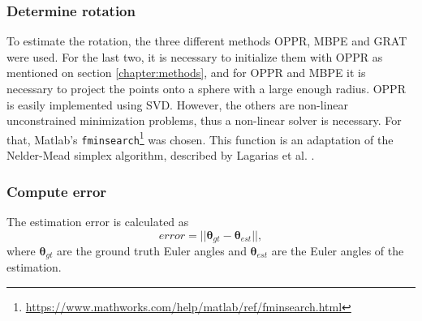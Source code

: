 \subsubsection{Determine rotation}
To estimate the rotation, the three different methods OPPR, MBPE and GRAT were used. For the last two, it is necessary to initialize them with OPPR as mentioned on section \ref{chapter:methods}, and for OPPR and MBPE it is necessary to project the points onto a sphere with a large enough radius. OPPR is easily implemented using SVD. However, the others are non-linear unconstrained minimization problems, thus a non-linear solver is necessary. For that, Matlab's \texttt{fminsearch}\footnote{\href{https://www.mathworks.com/help/matlab/ref/fminsearch.html}{https://www.mathworks.com/help/matlab/ref/fminsearch.html}} was chosen. This function is an adaptation of the Nelder-Mead simplex algorithm, described by Lagarias et al. \cite{lagarias}.

\subsubsection{Compute error}
The estimation error is calculated as
\begin{equation}
	error = ||{\mathbf{ \theta}_{gt}-\mathbf{ \theta}_{est}}||,
	\label{firenr}
\end{equation}
where $\mathbf{ \theta}_{gt}$ are the ground truth Euler angles and $\mathbf{ \theta}_{est}$ are the Euler angles of the estimation.

